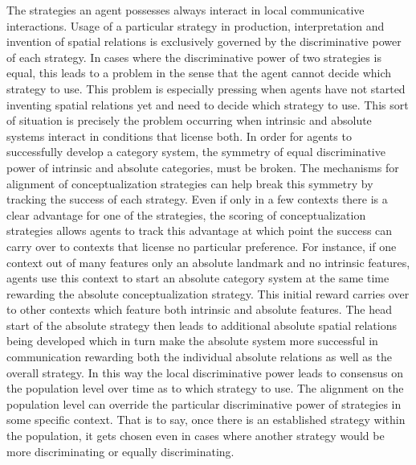 The strategies an agent possesses always interact in local communicative interactions.
Usage of a particular strategy in production, interpretation and invention of spatial relations
is exclusively governed by the discriminative power of each strategy. 
In cases where the discriminative power of two strategies is equal, this leads to a problem in the
sense that the agent cannot decide which strategy to use. 
This problem is especially pressing when agents have not started inventing spatial relations yet and need to decide which
strategy to use. This sort of situation 
is precisely the problem occurring when intrinsic 
and absolute systems interact in conditions that license both. In order for agents to successfully 
develop a category system, the symmetry of equal discriminative power of intrinsic and absolute 
categories, must be broken. The mechanisms for alignment of conceptualization strategies can
help break this symmetry by tracking the success of each strategy. Even if only in a few contexts
there is a clear advantage for one of the strategies, the scoring of conceptualization strategies 
allows agents to track this advantage at which point the success can carry over to 
contexts that license no particular preference. For instance, if one context out of many
features only an absolute landmark and no intrinsic features, agents use this context
to start an absolute category system at the same time rewarding the absolute conceptualization
strategy. This initial reward carries over to other contexts which feature both intrinsic and
absolute features. The head start of the absolute strategy then leads to additional 
absolute spatial relations being developed which in turn make the absolute system
more successful in communication rewarding both the individual absolute relations as
well as the overall strategy. In this way the local discriminative power 
leads to consensus on the population level over time as to which strategy to use. 
The alignment on the population level can override the particular discriminative power 
of strategies in some specific context. That is to say, once there is an established strategy 
within the population, it gets chosen even in cases where
another strategy would be more discriminating or equally discriminating.

